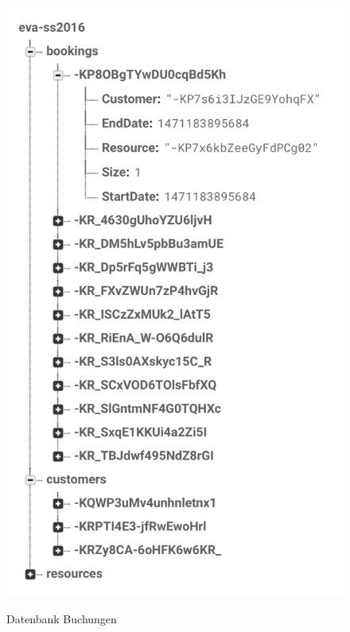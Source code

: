 \begin{figure}[H]
    \centering
    \begin{minipage}[t]{0.32\linewidth}
        \centering
        \includegraphics[width=\linewidth]{images/backend_database_bookings.png}
        \label{backend_database_bookings}
        \caption{Datenbank Buchungen}
    \end{minipage}%
    \hfill
    \begin{minipage}[t]{0.32\linewidth}
        \centering

\end{minipage}
\end{figure}
